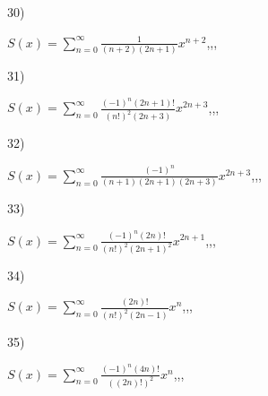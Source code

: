 \documentclass[11pt, ukrainian]{article}
\begin{document}
\par
\vspace{0.9cm}
30) \space 
{%
{$S(x)=\sum\limits_{n=0}^{\infty}{\frac{1}{(n+2)(2n+1)}}{x^{{n+2}}}$},,, \par \smallskip  
}
\par
\newpage
31) \space 
{%
{$S(x)=\sum\limits_{n=0}^{\infty}{\frac{{(-1)^n}(2n+1)!}{{(n!)^2}(2n+3)}}{x^{{2n+3}}}$},,, \par \smallskip  
}
\par
\vspace{0.9cm}
32) \space 
{%
{$S(x)=\sum\limits_{n=0}^{\infty}{\frac{(-1)^n}{(n+1)(2n+1)(2n+3)}}{x^{{2n+3}}}$},,, \par \smallskip  
}
\par
\vspace{0.9cm}
33) \space 
{%
{$S(x)=\sum\limits_{n=0}^{\infty}{\frac{{(-1)^n}(2n)!}{{(n!)^2}{(2n+1)^2}}}{x^{{2n+1}}}$},,, \par \smallskip  
}
\par
\vspace{0.9cm}
34) \space 
{%
{$S(x)=\sum\limits_{n=0}^{\infty}{\frac{(2n)!}{(n!)^2(2n-1)}}{x^{n}}$},,, \par \smallskip  
}
\par
\vspace{0.9cm}
35) \space 
{%
{$S(x)=\sum\limits_{n=0}^{\infty}{\frac{{(-1)^n}(4n)!}{{((2n)!)^2}}}{x^{{n}}}$},,, \par \smallskip  
}
\end{document}
